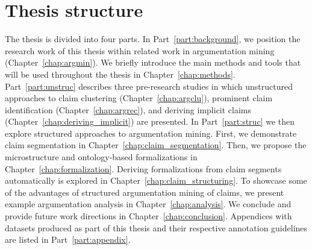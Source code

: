 \section{Thesis structure}

The thesis is divided into four parts. In Part~\ref{part:background}, 
we position the research work of this thesis within related work in 
argumentation mining (Chapter~\ref{chap:argmin}). We briefly introduce
the main methods and tools that will be used throughout the thesis in 
Chapter~\ref{chap:methods}. Part~\ref{part:unstruc} describes three 
pre-research studies in which unstructured approaches to 
claim clustering (Chapter~\ref{chap:argclu}), 
prominent claim identification (Chapter~\ref{chap:argrec}), and 
deriving implicit claims (Chapter~\ref{chap:deriving_implicit}) are presented. 
In Part~\ref{part:struc} we then explore structured approaches to argumentation mining. 
First, we demonstrate claim segmentation in Chapter~\ref{chap:claim_segmentation}.
Then, we propose the microstructure and ontology-based formalizations 
in Chapter~\ref{chap:formalization}. Deriving formalizations from 
claim segments automatically is explored in Chapter~\ref{chap:claim_structuring}.
To showcase some of the advantages of structured argumentation mining of claims,
we present example argumentation analysis in Chapter~\ref{chap:analysis}.
We conclude and provide future work directions in Chapter~\ref{chap:conclusion}.
Appendices with datasets produced as part of this thesis 
and their respective annotation
guidelines are listed in Part~\ref{part:appendix}. 

